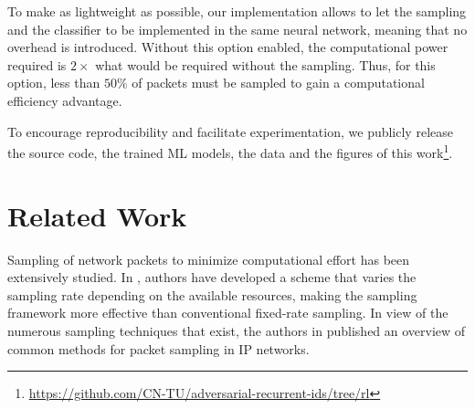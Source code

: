\documentclass[conference]{IEEEtran}
\begin{document}
To make \ours{} as lightweight as possible, our implementation allows to let the sampling and the classifier to be implemented in the same neural network, meaning that no overhead is introduced. Without this option enabled, the computational power required is $2\times$ what would be required without the sampling. Thus, for this option, less than $50\%$ of packets must be sampled to gain a computational efficiency advantage. 

To encourage reproducibility and facilitate experimentation, we publicly release the source code, the trained ML models, the data and the figures of this work\footnote{\url{https://github.com/CN-TU/adversarial-recurrent-ids/tree/rl}}.

\section{Related Work}


Sampling of network packets to minimize computational effort has been extensively studied. %
In \cite{estan_building_2004}, authors have developed a scheme that varies the sampling rate depending on the available resources, making the sampling framework more effective than conventional fixed-rate sampling. In view of the numerous sampling techniques that exist, the authors in \cite{zseby_sampling_2005} published an overview of common methods for packet sampling in IP networks.

\end{document}
